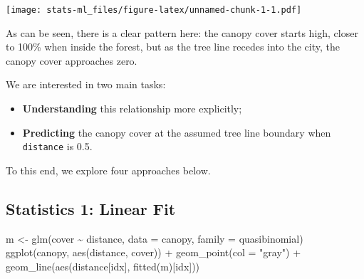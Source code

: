 \documentclass[
]{article}
\newenvironment{Shaded}{\begin{snugshade}}{\end{snugshade}}
\newcommand{\AttributeTok}[1]{\textcolor[rgb]{0.77,0.63,0.00}{#1}}
\newcommand{\CommentTok}[1]{\textcolor[rgb]{0.56,0.35,0.01}{\textit{#1}}}
\newcommand{\FunctionTok}[1]{\textcolor[rgb]{0.00,0.00,0.00}{#1}}
\newcommand{\NormalTok}[1]{#1}
\newcommand{\OtherTok}[1]{\textcolor[rgb]{0.56,0.35,0.01}{#1}}
\newcommand{\SpecialCharTok}[1]{\textcolor[rgb]{0.00,0.00,0.00}{#1}}
\newcommand{\StringTok}[1]{\textcolor[rgb]{0.31,0.60,0.02}{#1}}
\providecommand{\tightlist}{%
  \setlength{\itemsep}{0pt}\setlength{\parskip}{0pt}}
\begin{document}
\begin{Shaded}
\end{Shaded}

\texttt{[image: stats-ml\_files/figure-latex/unnamed-chunk-1-1.pdf]}

As can be seen, there is a clear pattern here: the canopy cover starts
high, closer to 100\% when inside the forest, but as the tree line
recedes into the city, the canopy cover approaches zero.

We are interested in two main tasks:

\begin{itemize}
\tightlist
\item
  \textbf{Understanding} this relationship more explicitly;
\item
  \textbf{Predicting} the canopy cover at the assumed tree line boundary
  when \texttt{distance} is 0.5.
\end{itemize}

To this end, we explore four approaches below.

\hypertarget{statistics-1-linear-fit}{%
\subsection{Statistics 1: Linear Fit}\label{statistics-1-linear-fit}}

\begin{Shaded}
\begin{Highlighting}[]
\NormalTok{m }\OtherTok{\textless{}{-}} \FunctionTok{glm}\NormalTok{(cover }\SpecialCharTok{\textasciitilde{}}\NormalTok{ distance, }\AttributeTok{data =}\NormalTok{ canopy, }\AttributeTok{family =}\NormalTok{ quasibinomial)}
\FunctionTok{ggplot}\NormalTok{(canopy, }\FunctionTok{aes}\NormalTok{(distance, cover)) }\SpecialCharTok{+} \FunctionTok{geom\_point}\NormalTok{(}\AttributeTok{col =} \StringTok{"gray"}\NormalTok{) }\SpecialCharTok{+}
  \FunctionTok{geom\_line}\NormalTok{(}\FunctionTok{aes}\NormalTok{(distance[idx], }\FunctionTok{fitted}\NormalTok{(m)[idx]))}
\end{Highlighting}
\end{Shaded}
\end{document}

